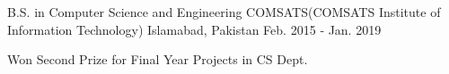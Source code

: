 

\begin{cventries}

  \cventry
    {B.S. in Computer Science and Engineering} %
    {COMSATS(COMSATS Institute of Information Technology)} %
    {Islamabad, Pakistan} %
    {Feb. 2015 ‑ Jan. 2019} %
    {
      \begin{cvitems} %
        \item {Won Second Prize for Final Year Projects in CS Dept.}
      \end{cvitems}
    }

\end{cventries}
